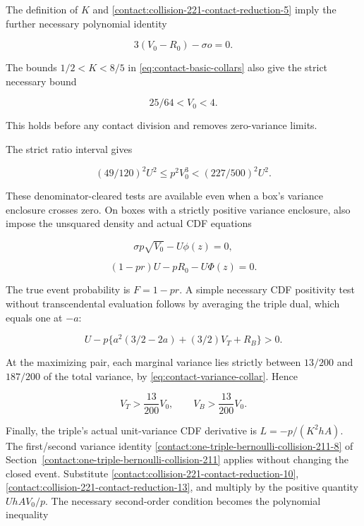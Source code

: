 The definition of $K$ and \eqref{contact:collision-221-contact-reduction-5} imply the further necessary polynomial
identity

\[
 \boxed{\quad 3(V_0-R_0)-\sigma o=0.\quad}
\tag{B.15.11}\label{contact:collision-221-contact-reduction-11}
\]

The bounds $1/2<K<8/5$ in \eqref{eq:contact-basic-collars}
also give the strict necessary bound

\[
 \boxed{\quad 25/64<V_0<4.\quad}
\tag{B.15.11a}\label{contact:collision-221-contact-reduction-11a}
\]

This holds before any contact division and removes zero-variance limits.

The strict ratio interval gives

\[
 (49/120)^2U^2\le p^2V_0^3<(227/500)^2U^2.
\tag{B.15.12}\label{contact:collision-221-contact-reduction-12}
\]

These denominator-cleared tests are available even when a box's variance
enclosure crosses zero. On boxes with a strictly positive variance
enclosure, also impose the unsquared density and actual CDF equations

\[
 \boxed{\quad \sigma p\sqrt{V_0}-U\phi(z)=0,\quad}
\tag{B.15.13}\label{contact:collision-221-contact-reduction-13}
\]

\[
 \boxed{\quad (1-pr)U-pR_0-U\Phi(z)=0.\quad}
\tag{B.15.14}\label{contact:collision-221-contact-reduction-14}
\]

The true event probability is $F=1-pr$. A simple necessary CDF positivity
test without transcendental evaluation follows by averaging the triple
dual, which equals one at $-a$:

\[
 \boxed{\quad U-p\{a^2(3/2-2a)+(3/2)V_T+R_B\}>0.\quad}
\tag{B.15.15}\label{contact:collision-221-contact-reduction-15}
\]

At the maximizing pair, each marginal variance lies strictly between
$13/200$ and $187/200$ of the total variance, by
\eqref{eq:contact-variance-collar}. Hence

\[
 \boxed{\quad V_T>\frac{13}{200}V_0,
                 \qquad V_B>\frac{13}{200}V_0.\quad}
\tag{B.15.16}\label{contact:collision-221-contact-reduction-16}
\]

Finally, the triple's actual unit-variance CDF derivative is
$L=-p/(K^2 hA)$. The first/second variance identity \eqref{contact:one-triple-bernoulli-collision-211-8} of
Section~\ref{contact:one-triple-bernoulli-collision-211}
applies without changing the closed event. Substitute \eqref{contact:collision-221-contact-reduction-10}, \eqref{contact:collision-221-contact-reduction-13}, and
multiply by the positive quantity $U h A V_0/p$. The necessary
second-order condition becomes the polynomial inequality


